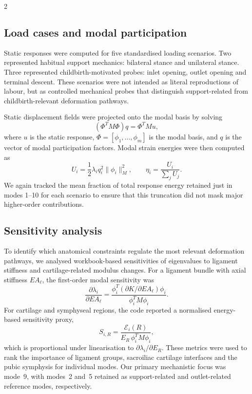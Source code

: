 \documentclass[openacc]{rsproca_new}
\begin{document}
\begin{multicols}{2}
\subsection{Load cases and modal participation}

Static responses were computed for five standardised loading scenarios. Two represented habitual support mechanics: bilateral stance and unilateral stance. Three represented childbirth-motivated probes: inlet opening, outlet opening and terminal descent. These scenarios were not intended as literal reproductions of labour, but as controlled mechanical probes that distinguish support-related from childbirth-relevant deformation pathways.

Static displacement fields were projected onto the modal basis by solving
\begin{equation}
(\Phi^{T}M\Phi)q = \Phi^{T}Mu,
\end{equation}
where $u$ is the static response, $\Phi=[\phi_{1},\ldots,\phi_{m}]$ is the modal basis, and $q$ is the vector of modal participation factors. Modal strain energies were then computed as
\begin{equation}
U_{i}=\frac{1}{2}\lambda_{i}q_{i}^{2}\lVert\phi_{i}\rVert_{M}^{2}, \qquad
\eta_{i}=\frac{U_{i}}{\sum_{j}U_{j}}.
\end{equation}
We again tracked the mean fraction of total response energy retained just in modes 1–10 for each scenario to ensure that this truncation did not mask major higher-order contributions.


\subsection{Sensitivity analysis}

To identify which anatomical constraints regulate the most relevant deformation pathways, we analysed workbook-based sensitivities of eigenvalues to ligament stiffness and cartilage-related modulus changes. For a ligament bundle with axial stiffness $EA_{\ell}$, the first-order modal sensitivity was
\begin{equation}
\frac{\partial \lambda_{i}}{\partial EA_{\ell}}
=
\frac{\phi_{i}^{T}(\partial K/\partial EA_{\ell})\phi_{i}}
{\phi_{i}^{T}M\phi_{i}}.
\end{equation}
For cartilage and symphyseal regions, the code reported a normalised energy-based sensitivity proxy,
\begin{equation}
S_{i,R}=\frac{\mathcal{E}_{i}(R)}{E_{R}\,\phi_{i}^{T}M\phi_{i}},
\end{equation}
which is proportional under linearisation to $\partial \lambda_{i}/\partial E_{R}$. These metrics were used to rank the importance of ligament groups, sacroiliac cartilage interfaces and the pubic symphysis for individual modes. Our primary mechanistic focus was mode~9, with modes~2 and~5 retained as support-related and outlet-related reference modes, respectively.


\end{multicols}
\end{document}
